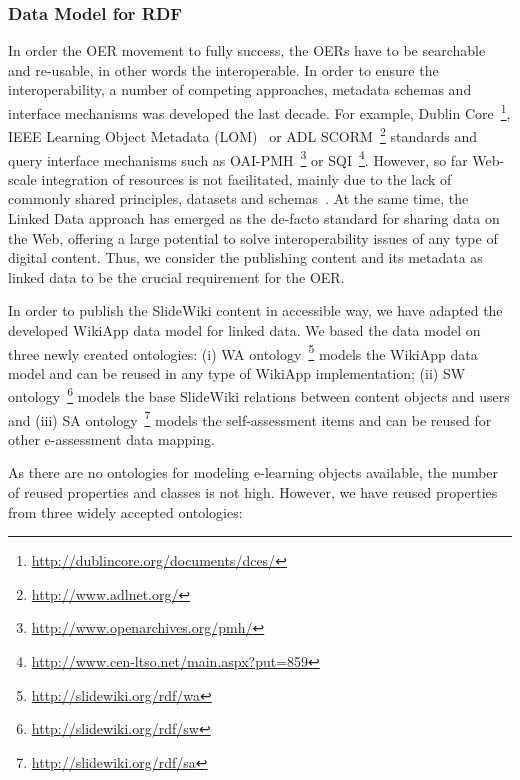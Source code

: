 \documentclass[ngerman,UKenglish,table]{scrbook}
\begin{document}
 

\subsubsection{Data Model for RDF}
\label{subsec:data_model_rdf}

In order the OER movement to fully success, the OERs have to be searchable and re-usable, in other words the interoperable.
In order to ensure the interoperability, a number of competing approaches, metadata schemas and interface mechanisms was developed the last decade. 
For example, Dublin Core~\footnote{\url{http://dublincore.org/documents/dces/}}, IEEE Learning Object Metadata (LOM)~\cite{learning2002ieee} or ADL SCORM~\footnote{\url{http://www.adlnet.org/}} standards and query interface mechanisms such as OAI-PMH~\footnote{\url{http://www.openarchives.org/pmh/}} or SQI~\footnote{\url{http://www.cen-ltso.net/main.aspx?put=859}}.
However, so far Web-scale integration of resources is not facilitated, mainly due to the lack of commonly shared principles, datasets and schemas~\cite{Dietze:2012:LEI:2245276.2245347}.
At the same time, the Linked Data approach has emerged as the de-facto standard for sharing data on the Web, offering a large potential to solve interoperability issues of any type of digital content.
Thus, we consider the publishing content and its metadata as linked data to be the crucial requirement for the OER.

In order to publish the SlideWiki content in accessible way, we have adapted the developed WikiApp data model for linked data. 
We based the data model on three newly created ontologies: (i) WA ontology~\footnote{\url{http://slidewiki.org/rdf/wa}} models the WikiApp data model and can be reused in any type of WikiApp implementation; (ii) SW ontology~\footnote{\url{http://slidewiki.org/rdf/sw}} models the base SlideWiki relations between content objects and users and (iii) SA ontology~\footnote{\url{http://slidewiki.org/rdf/sa}} models the self-assessment items and can be reused for other e-assessment data mapping.

As there are no ontologies for modeling e-learning objects available, the number of reused properties and classes is not high.
However, we have reused properties from three widely accepted ontologies: 
\end{document}
